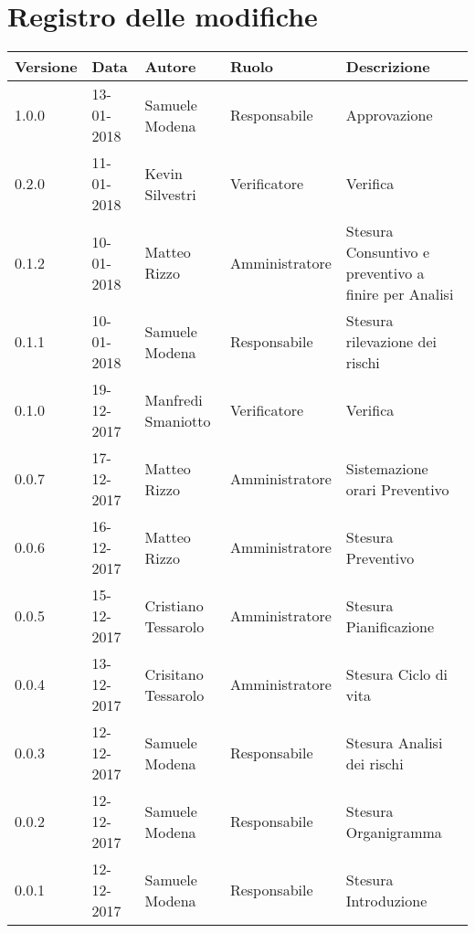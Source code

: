 \documentclass[./PianodiProgetto.tex]{subfiles}
\begin{document}
\chapter*{Registro delle modifiche}
\begin{center}	
	\begin{tabular}{|l|l|l|l|p{4cm}|}
		\hline
		\textbf{Versione} & \textbf{Data} & \textbf{Autore} & \textbf{Ruolo} & \textbf{Descrizione} \\ \hline
		\hline 1.0.0 & 13-01-2018 & Samuele Modena & Responsabile & Approvazione \\
 
		\hline 0.2.0 & 11-01-2018 & Kevin Silvestri & Verificatore & Verifica \\
 
		\hline 0.1.2 & 10-01-2018 & Matteo Rizzo & Amministratore & Stesura Consuntivo e preventivo a finire per Analisi \\
 
		\hline 0.1.1 & 10-01-2018 & Samuele Modena & Responsabile & Stesura rilevazione dei rischi \\
 
		\hline 0.1.0 & 19-12-2017 & Manfredi Smaniotto & Verificatore & Verifica \\
 		
 		\hline 0.0.7 & 17-12-2017 & Matteo Rizzo & Amministratore & Sistemazione orari Preventivo \\
 		
		\hline 0.0.6 & 16-12-2017 & Matteo Rizzo & Amministratore & Stesura Preventivo \\
 
		\hline 0.0.5 & 15-12-2017 & Cristiano Tessarolo & Amministratore & Stesura Pianificazione \\
 
		\hline 0.0.4 & 13-12-2017 & Crisitano Tessarolo & Amministratore & Stesura Ciclo di vita \\
 
		\hline 0.0.3 & 12-12-2017 & Samuele Modena & Responsabile & Stesura Analisi dei rischi \\
 
 		\hline 0.0.2 & 12-12-2017 & Samuele Modena & Responsabile & Stesura Organigramma \\
 		
		\hline 0.0.1 & 12-12-2017 & Samuele Modena & Responsabile & Stesura Introduzione \\
 
		\hline
 
	\end{tabular}
\end{center}	
\end{document}

